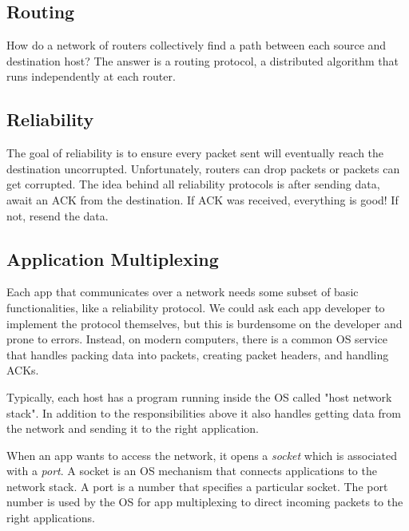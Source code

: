 \subsection{Routing}
How do a network of routers collectively find a path between each
source and destination host? The answer is a routing protocol,
a distributed algorithm that runs independently at each router.

\subsection{Reliability}
The goal of reliability is to ensure every packet sent will
eventually reach the destination uncorrupted. Unfortunately,
routers can drop packets or packets can get corrupted. The idea
behind all reliability protocols is after sending data, await an
ACK from the destination. If ACK was received, everything is good!
If not, resend the data.

\subsection{Application Multiplexing}
Each app that communicates over a network needs some subset of
basic functionalities, like a reliability protocol. We could ask
each app developer to implement the protocol themselves, but this
is burdensome on the developer and prone to errors. Instead, on
modern computers, there is a common OS service that handles
packing data into packets, creating packet headers, and handling ACKs.

Typically, each host has a program running inside the OS called
"host network stack". In addition to the responsibilities above it
also handles getting data from the network and sending it to the right
application.

When an app wants to access the network, it opens a \emph{socket} which
is associated with a \emph{port}. A socket is an OS mechanism that connects
applications to the network stack. A port is a number that specifies a
particular socket. The port number is used by the OS for app multiplexing
to direct incoming packets to the right applications.